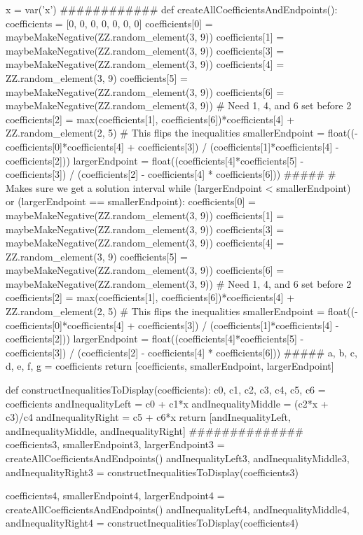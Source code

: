 \documentclass{ximera}
\begin{document}
\begin{sagesilent}
x = var('x')
############
def createAllCoefficientsAndEndpoints():
    coefficients = [0, 0, 0, 0, 0, 0, 0]
    coefficients[0] = maybeMakeNegative(ZZ.random_element(3, 9))
    coefficients[1] = maybeMakeNegative(ZZ.random_element(3, 9))
    coefficients[3] = maybeMakeNegative(ZZ.random_element(3, 9))
    coefficients[4] = ZZ.random_element(3, 9)
    coefficients[5] = maybeMakeNegative(ZZ.random_element(3, 9))
    coefficients[6] = maybeMakeNegative(ZZ.random_element(3, 9))
    # Need 1, 4, and 6 set before 2
    coefficients[2] = max(coefficients[1], coefficients[6])*coefficients[4] + ZZ.random_element(2, 5)
    # This flips the inequalities
    smallerEndpoint = float((-coefficients[0]*coefficients[4] + coefficients[3]) / (coefficients[1]*coefficients[4] - coefficients[2]))
    largerEndpoint = float((coefficients[4]*coefficients[5] - coefficients[3]) / (coefficients[2] - coefficients[4] * coefficients[6]))
    #####
    # Makes sure we get a solution interval
    while  (largerEndpoint < smallerEndpoint) or (largerEndpoint == smallerEndpoint):
        coefficients[0] = maybeMakeNegative(ZZ.random_element(3, 9))
        coefficients[1] = maybeMakeNegative(ZZ.random_element(3, 9))
        coefficients[3] = maybeMakeNegative(ZZ.random_element(3, 9))
        coefficients[4] = ZZ.random_element(3, 9)
        coefficients[5] = maybeMakeNegative(ZZ.random_element(3, 9))
        coefficients[6] = maybeMakeNegative(ZZ.random_element(3, 9))
        # Need 1, 4, and 6 set before 2
        coefficients[2] = max(coefficients[1], coefficients[6])*coefficients[4] + ZZ.random_element(2, 5)
        # This flips the inequalities
        smallerEndpoint = float((-coefficients[0]*coefficients[4] + coefficients[3]) / (coefficients[1]*coefficients[4] - coefficients[2]))
        largerEndpoint = float((coefficients[4]*coefficients[5] - coefficients[3]) / (coefficients[2] - coefficients[4] * coefficients[6]))
    #####
    a, b, c, d, e, f, g = coefficients
    return [coefficients, smallerEndpoint, largerEndpoint]

def constructInequalitiesToDisplay(coefficients):
    c0, c1, c2, c3, c4, c5, c6 = coefficients
    andInequalityLeft = c0 + c1*x
    andInequalityMiddle = (c2*x + c3)/c4
    andInequalityRight = c5 + c6*x
    return [andInequalityLeft, andInequalityMiddle, andInequalityRight]
##############
coefficients3, smallerEndpoint3, largerEndpoint3 = createAllCoefficientsAndEndpoints()
andInequalityLeft3, andInequalityMiddle3, andInequalityRight3 = constructInequalitiesToDisplay(coefficients3)

coefficients4, smallerEndpoint4, largerEndpoint4 = createAllCoefficientsAndEndpoints()
andInequalityLeft4, andInequalityMiddle4, andInequalityRight4 = constructInequalitiesToDisplay(coefficients4)
\end{sagesilent}
\end{document}
